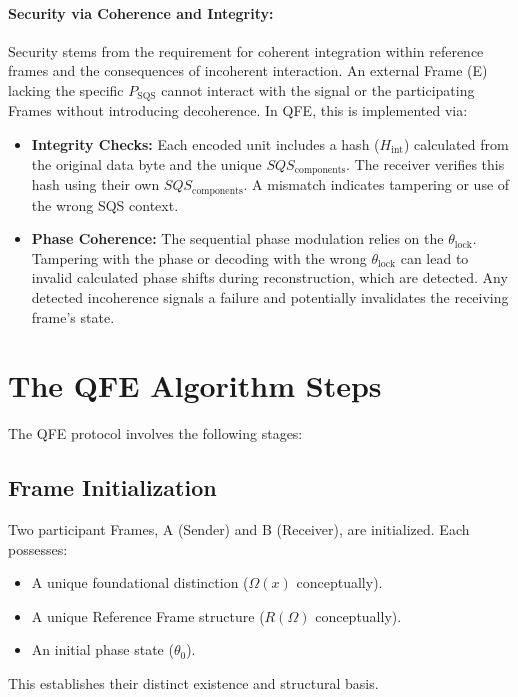 \documentclass[11pt]{article}
\newcommand{\OmegaFunc}{\Omega(x)}         %
\newcommand{\RFunc}{R(\Omega)}           %
\newcommand{\SQS}{P_{\text{SQS}}}        %
\newcommand{\SQScomp}{SQS_{\text{components}}} %
\newcommand{\SQSphase}{\theta_{\text{lock}}} %
\newcommand{\IntegHash}{H_{\text{int}}}   %
\begin{document}
	\paragraph{Security via Coherence and Integrity:} Security stems from the requirement for coherent integration within reference frames and the consequences of incoherent interaction. An external Frame (E) lacking the specific $\SQS$ cannot interact with the signal or the participating Frames without introducing decoherence. In QFE, this is implemented via:
	\begin{itemize}
		\item \textbf{Integrity Checks:} Each encoded unit includes a hash ($\IntegHash$) calculated from the original data byte and the unique $\SQScomp$. The receiver verifies this hash using their own $\SQScomp$. A mismatch indicates tampering or use of the wrong SQS context.
		\item \textbf{Phase Coherence:} The sequential phase modulation relies on the $\SQSphase$. Tampering with the phase or decoding with the wrong $\SQSphase$ can lead to invalid calculated phase shifts during reconstruction, which are detected. Any detected incoherence signals a failure and potentially invalidates the receiving frame's state.
	\end{itemize}
	
	
	\section{The QFE Algorithm Steps}
	
	The QFE protocol involves the following stages:
	
	\subsection{Frame Initialization}
	Two participant Frames, A (Sender) and B (Receiver), are initialized. Each possesses:
	\begin{itemize}
		\item A unique foundational distinction ($\OmegaFunc$ conceptually).
		\item A unique Reference Frame structure ($\RFunc$ conceptually).
		\item An initial phase state ($\theta_0$).
	\end{itemize}
	This establishes their distinct existence and structural basis.
	
\end{document}
